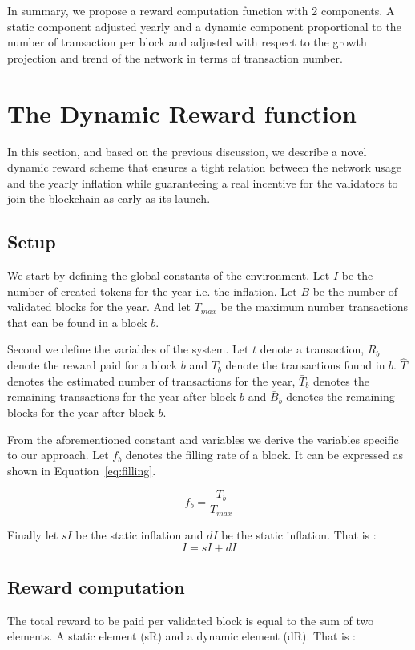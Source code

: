 \documentclass[conference]{IEEEtran}
\begin{document}
In summary, we propose a reward computation function with 2 components. A static component adjusted yearly and a dynamic component proportional to the number of transaction per block and adjusted with respect to the growth projection and trend of the network in terms of transaction number.  

\section{The Dynamic Reward function}
\label{sec:scheme}
In this section, and based on the previous discussion, we describe  a novel dynamic reward scheme that ensures a tight relation between the network usage and the yearly inflation while guaranteeing a real incentive for the validators to join the blockchain as early as its launch.  

\subsection{Setup} 
\label{setup}
We start by defining the global constants of the environment. Let  $I$ be the number of created tokens for the year i.e. the inflation. Let $B$ be the number of validated blocks for the year. And let $T_{max}$ be the maximum number transactions that can be found in a block $b$.

Second we define the variables of the system. Let $t$ denote a transaction, $R_b$ denote the reward paid for a block $b$ and $T_b$ denote the transactions found in $b$. $\hat{T}$ denotes the estimated number of transactions for the year, $\bar{T}_b$ denotes the remaining transactions for the year after block $b$ and $\bar{B}_b$ denotes the remaining blocks for the year after block $b$.


From the aforementioned constant and variables we derive the variables specific to our approach. Let $f_b$ denotes the filling rate of a block. It can be expressed as shown in Equation~\ref{eq:filling}. 

\begin{equation}
        f_b=\frac{T_b}{T_{max}}
        \label{eq:filling}
\end{equation}

Finally let $sI$ be the static inflation and $dI$ be the static inflation. That is :  
\begin{equation}
    I=sI+dI	
    \label{eq:inflationsplit}
\end{equation}

				
\subsection{Reward computation}
The total reward to be paid per validated block is equal to the sum of two elements. A static element (sR) and a dynamic element (dR). That is :
					
\end{document}
